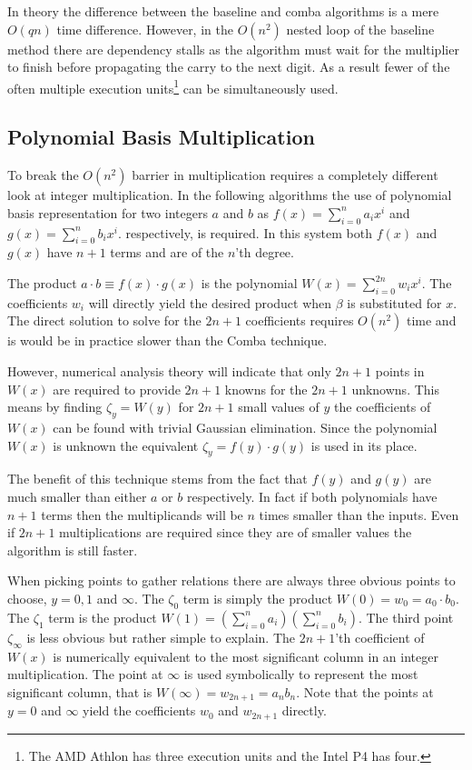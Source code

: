 \documentclass[b5paper]{book}
\begin{document}
In theory the difference between the baseline and comba algorithms is a mere $O(qn)$ time difference.  However, in the $O(n^2)$ nested loop of the
baseline method there are dependency stalls as the algorithm must wait for the multiplier to finish before propagating the carry to the next 
digit.  As a result fewer of the often multiple execution units\footnote{The AMD Athlon has three execution units and the Intel P4 has four.} can
be simultaneously used.  

\subsection{Polynomial Basis Multiplication}
To break the $O(n^2)$ barrier in multiplication requires a completely different look at integer multiplication.  In the following algorithms
the use of polynomial basis representation for two integers $a$ and $b$ as $f(x) = \sum_{i=0}^{n} a_i x^i$ and  
$g(x) = \sum_{i=0}^{n} b_i x^i$. respectively, is required.  In this system both $f(x)$ and $g(x)$ have $n + 1$ terms and are of the $n$'th degree.
 
The product $a \cdot b \equiv f(x) \cdot g(x)$ is the polynomial $W(x) = \sum_{i=0}^{2n} w_i x^i$.  The coefficients $w_i$ will
directly yield the desired product when $\beta$ is substituted for $x$.  The direct solution to solve for the $2n + 1$ coefficients
requires $O(n^2)$ time and is would be in practice slower than the Comba technique.

However, numerical analysis theory will indicate that only $2n + 1$ points in $W(x)$ are required to provide $2n + 1$ knowns for the $2n + 1$ unknowns.  
This means by finding $\zeta_y = W(y)$ for $2n + 1$ small values of $y$ the coefficients of $W(x)$ can be found with trivial Gaussian elimination.  
Since the polynomial $W(x)$ is unknown the equivalent $\zeta_y = f(y) \cdot g(y)$ is used in its place.  

The benefit of this technique stems from the fact that $f(y)$ and $g(y)$ are much smaller than either $a$ or $b$ respectively.  In fact if 
both polynomials have $n + 1$ terms then the multiplicands will be $n$  times smaller than the inputs.  Even if $2n + 1$ multiplications are required
since they are of smaller values the algorithm is still faster.

When picking points to gather relations there are always three obvious points to choose, $y = 0, 1$ and $ \infty$.  The $\zeta_0$ term
is simply the product $W(0) = w_0 = a_0 \cdot b_0$.  The $\zeta_1$ term is the product 
$W(1) = \left (\sum_{i = 0}^{n} a_i \right ) \left (\sum_{i = 0}^{n} b_i \right )$.  The third point $\zeta_{\infty}$ is less obvious but rather
simple to explain.  The $2n + 1$'th coefficient of $W(x)$ is numerically equivalent to the most significant column in an integer multiplication.  
The point at $\infty$ is used symbolically to represent the most significant column, that is $W(\infty) = w_{2n + 1} = a_nb_n$.  Note that the 
points at $y = 0$ and $\infty$ yield the coefficients $w_0$ and $w_{2n + 1}$ directly.
\end{document}

